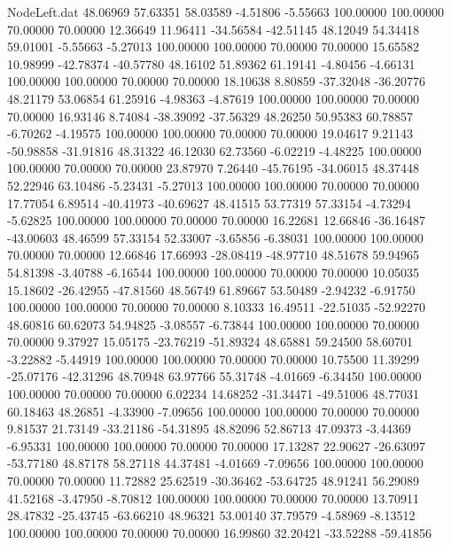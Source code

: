 \begin{filecontents}{NodeLeft.dat}
  48.06969   57.63351   58.03589    -4.51806   -5.55663  100.00000  100.00000   70.00000   70.00000   12.36649   11.96411  -34.56584  -42.51145
  48.12049   54.34418   59.01001    -5.55663   -5.27013  100.00000  100.00000   70.00000   70.00000   15.65582   10.98999  -42.78374  -40.57780
  48.16102   51.89362   61.19141    -4.80456   -4.66131  100.00000  100.00000   70.00000   70.00000   18.10638    8.80859  -37.32048  -36.20776
  48.21179   53.06854   61.25916    -4.98363   -4.87619  100.00000  100.00000   70.00000   70.00000   16.93146    8.74084  -38.39092  -37.56329
  48.26250   50.95383   60.78857    -6.70262   -4.19575  100.00000  100.00000   70.00000   70.00000   19.04617    9.21143  -50.98858  -31.91816
  48.31322   46.12030   62.73560    -6.02219   -4.48225  100.00000  100.00000   70.00000   70.00000   23.87970    7.26440  -45.76195  -34.06015
  48.37448   52.22946   63.10486    -5.23431   -5.27013  100.00000  100.00000   70.00000   70.00000   17.77054    6.89514  -40.41973  -40.69627
  48.41515   53.77319   57.33154    -4.73294   -5.62825  100.00000  100.00000   70.00000   70.00000   16.22681   12.66846  -36.16487  -43.00603
  48.46599   57.33154   52.33007    -3.65856   -6.38031  100.00000  100.00000   70.00000   70.00000   12.66846   17.66993  -28.08419  -48.97710
  48.51678   59.94965   54.81398    -3.40788   -6.16544  100.00000  100.00000   70.00000   70.00000   10.05035   15.18602  -26.42955  -47.81560
  48.56749   61.89667   53.50489    -2.94232   -6.91750  100.00000  100.00000   70.00000   70.00000    8.10333   16.49511  -22.51035  -52.92270
  48.60816   60.62073   54.94825    -3.08557   -6.73844  100.00000  100.00000   70.00000   70.00000    9.37927   15.05175  -23.76219  -51.89324
  48.65881   59.24500   58.60701    -3.22882   -5.44919  100.00000  100.00000   70.00000   70.00000   10.75500   11.39299  -25.07176  -42.31296
  48.70948   63.97766   55.31748    -4.01669   -6.34450  100.00000  100.00000   70.00000   70.00000    6.02234   14.68252  -31.34471  -49.51006
  48.77031   60.18463   48.26851    -4.33900   -7.09656  100.00000  100.00000   70.00000   70.00000    9.81537   21.73149  -33.21186  -54.31895
  48.82096   52.86713   47.09373    -3.44369   -6.95331  100.00000  100.00000   70.00000   70.00000   17.13287   22.90627  -26.63097  -53.77180
  48.87178   58.27118   44.37481    -4.01669   -7.09656  100.00000  100.00000   70.00000   70.00000   11.72882   25.62519  -30.36462  -53.64725
  48.91241   56.29089   41.52168    -3.47950   -8.70812  100.00000  100.00000   70.00000   70.00000   13.70911   28.47832  -25.43745  -63.66210
  48.96321   53.00140   37.79579    -4.58969   -8.13512  100.00000  100.00000   70.00000   70.00000   16.99860   32.20421  -33.52288  -59.41856

\end{filecontents}
